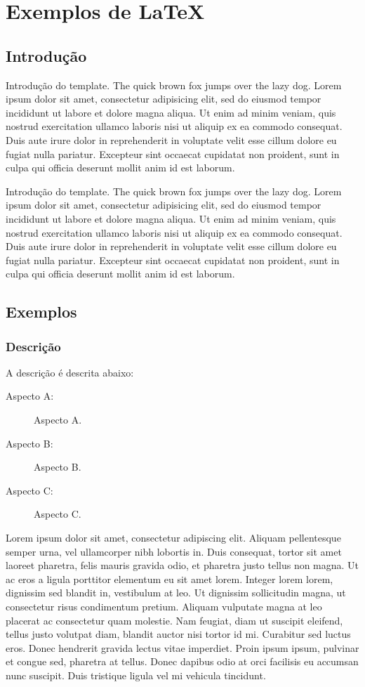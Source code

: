 \chapter{Exemplos de \LaTeX}


\section{Introdução}

Introdução do template. The quick brown fox jumps over the lazy dog. Lorem
ipsum dolor sit amet, consectetur adipisicing elit, sed do eiusmod tempor
incididunt ut labore et dolore magna aliqua. Ut enim ad minim veniam, quis
nostrud exercitation ullamco laboris nisi ut aliquip ex ea commodo consequat.
Duis aute irure dolor in reprehenderit in voluptate velit esse cillum dolore eu
fugiat nulla pariatur. Excepteur sint occaecat cupidatat non proident, sunt in
culpa qui officia deserunt mollit anim id est laborum.

Introdução do template. The quick brown fox jumps over the lazy dog. Lorem
ipsum dolor sit amet, consectetur adipisicing elit, sed do eiusmod tempor
incididunt ut labore et dolore magna aliqua. Ut enim ad minim veniam, quis
nostrud exercitation ullamco laboris nisi ut aliquip ex ea commodo consequat.
Duis aute irure dolor in reprehenderit in voluptate velit esse cillum dolore eu
fugiat nulla pariatur. Excepteur sint occaecat cupidatat non proident, sunt in
culpa qui officia deserunt mollit anim id est laborum.



\section{Exemplos}


\subsection{Descrição}

A descrição é descrita abaixo:

\begin{description}
\item[Aspecto A:] Aspecto A.
\item[Aspecto B:] Aspecto B.
\item[Aspecto C:] Aspecto C.
\end{description}

Lorem ipsum dolor sit amet, consectetur adipiscing elit. Aliquam pellentesque semper urna, vel ullamcorper nibh lobortis in. Duis consequat, tortor sit amet laoreet pharetra, felis mauris gravida odio, et pharetra justo tellus non magna. Ut ac eros a ligula porttitor elementum eu sit amet lorem. Integer lorem lorem, dignissim sed blandit in, vestibulum at leo. Ut dignissim sollicitudin magna, ut consectetur risus condimentum pretium. Aliquam vulputate magna at leo placerat ac consectetur quam molestie. Nam feugiat, diam ut suscipit eleifend, tellus justo volutpat diam, blandit auctor nisi tortor id mi. Curabitur sed luctus eros. Donec hendrerit gravida lectus vitae imperdiet. Proin ipsum ipsum, pulvinar et congue sed, pharetra at tellus. Donec dapibus odio at orci facilisis eu accumsan nunc suscipit. Duis tristique ligula vel mi vehicula tincidunt.

